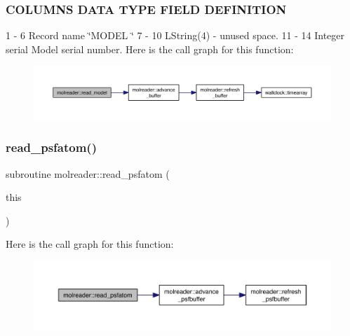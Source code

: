 \subsubsection*{C\+O\+L\+U\+M\+NS D\+A\+TA T\+Y\+PE F\+I\+E\+LD D\+E\+F\+I\+N\+I\+T\+I\+ON }

1 -\/ 6 Record name \char`\"{}\+M\+O\+D\+E\+L \char`\"{} 7 -\/ 10 L\+String(4) -\/ unused space. 11 -\/ 14 Integer serial Model serial number. Here is the call graph for this function\+:\nopagebreak
\begin{figure}[H]
\begin{center}
\leavevmode
\includegraphics[width=350pt]{namespacemolreader_a64ff990dc05c01debc1138dd012f4bcb_cgraph}
\end{center}
\end{figure}
\mbox{\label{namespacemolreader_a81fcc5a3f49380ccd10b02b229f5067d}} 
\subsubsection{\texorpdfstring{read\+\_\+psfatom()}{read\_psfatom()}}
{\footnotesize\ttfamily subroutine molreader\+::read\+\_\+psfatom (\begin{DoxyParamCaption}\item[{type(\hyperlink{structmolreader_1_1psfatom}{psfatom}), intent(inout)}]{this }\end{DoxyParamCaption})\hspace{0.3cm}{\ttfamily [private]}}

Here is the call graph for this function\+:\nopagebreak
\begin{figure}[H]
\begin{center}
\leavevmode
\includegraphics[width=350pt]{namespacemolreader_a81fcc5a3f49380ccd10b02b229f5067d_cgraph}
\end{center}
\end{figure}
\mbox{\label{namespacemolreader_a16d4776fded57cf8aa38f639610cad84}} 
